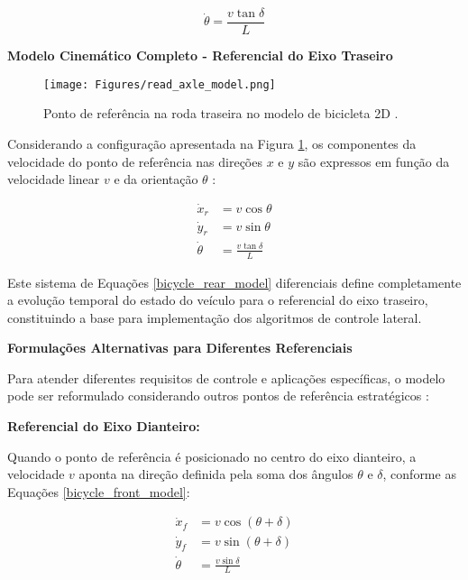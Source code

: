 \begin{equation} \label{icr_relation}
\dot{\theta} = \frac{v \tan \delta}{L}
\end{equation}

\textbf{Modelo Cinemático Completo - Referencial do Eixo Traseiro}

\begin{figure}[H]
\centering
\texttt{[image: Figures/read\_axle\_model.png]}
\caption{Ponto de referência na roda traseira no modelo de bicicleta 2D \cite[Week 4 - Lesson 2: The Kinematic Bicycle Model. ~3min46s]{University_of_Toronto2018-fe}.}
\label{rear_axle}
\end{figure}

Considerando a configuração apresentada na Figura \ref{rear_axle}, os componentes da velocidade do ponto de referência nas direções $x$ e $y$ são expressos em função da velocidade linear $v$ e da orientação $\theta$ \cite{University_of_Toronto2018-fe}:

\begin{equation} \label{bicycle_rear_model}
\begin{aligned}
\dot{x}_r &= v \cos \theta \\
\dot{y}_r &= v \sin \theta \\
\dot{\theta} &= \frac{v \tan \delta}{L}
\end{aligned}
\end{equation}

Este sistema de Equações \ref{bicycle_rear_model} diferenciais define completamente a evolução temporal do estado do veículo para o referencial do eixo traseiro, constituindo a base para implementação dos algoritmos de controle lateral.

\textbf{Formulações Alternativas para Diferentes Referenciais}

Para atender diferentes requisitos de controle e aplicações específicas, o modelo pode ser reformulado considerando outros pontos de referência estratégicos \cite{University_of_Toronto2018-fe}:

\textbf{Referencial do Eixo Dianteiro:}

Quando o ponto de referência é posicionado no centro do eixo dianteiro, a velocidade $v$ aponta na direção definida pela soma dos ângulos $\theta$ e $\delta$, conforme as Equações \ref{bicycle_front_model}:

\begin{equation} \label{bicycle_front_model}
\begin{aligned}
\dot{x}_f &= v \cos(\theta + \delta) \\
\dot{y}_f &= v \sin(\theta + \delta) \\
\dot{\theta} &= \frac{v \sin \delta}{L}
\end{aligned}
\end{equation}


